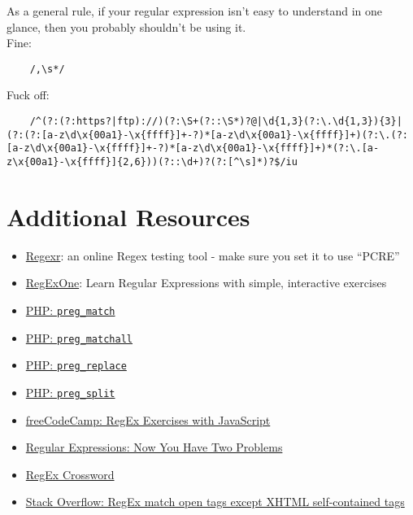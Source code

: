 As a general rule, if your regular expression isn't easy to understand in one glance, then you probably shouldn't be using it.
\\

Fine:

\begin{verbatim}
    /,\s*/
\end{verbatim}

Fuck off:

\begin{verbatim}
    /^(?:(?:https?|ftp)://)(?:\S+(?::\S*)?@|\d{1,3}(?:\.\d{1,3}){3}|(?:(?:[a-z\d\x{00a1}-\x{ffff}]+-?)*[a-z\d\x{00a1}-\x{ffff}]+)(?:\.(?:[a-z\d\x{00a1}-\x{ffff}]+-?)*[a-z\d\x{00a1}-\x{ffff}]+)*(?:\.[a-z\x{00a1}-\x{ffff}]{2,6}))(?::\d+)?(?:[^\s]*)?$/iu
\end{verbatim}



\section{Additional Resources}

\begin{itemize}[leftmargin=*]
    \item \href{https://regexr.com}{Regexr}: an online Regex testing tool - make sure you set it to use ``PCRE''
    \item \href{https://regexone.com/}{RegExOne}: Learn Regular Expressions with simple, interactive exercises
    \item \href{http://www.php.net/manual/en/function.preg-match.php}{PHP: \texttt{preg\_match}}
    \item \href{http://www.php.net/manual/en/function.preg-match-all.php}{PHP: \texttt{preg\_matchall}}
    \item \href{http://www.php.net/manual/en/function.preg-replace.php}{PHP: \texttt{preg\_replace}}
    \item \href{http://www.php.net/manual/en/function.preg-split.php}{PHP: \texttt{preg\_split}}
    \item \href{https://www.freecodecamp.org/learn/javascript-algorithms-and-data-structures/regular-expressions/using-the-test-method}{freeCodeCamp: RegEx Exercises with JavaScript}
    \item \href{https://blog.codinghorror.com/regular-expressions-now-you-have-two-problems/}{Regular Expressions: Now You Have Two Problems}
    \item \href{http://www.regexcrossword.com/}{RegEx Crossword}
    \item \href{https://stackoverflow.com/a/1732454}{Stack Overflow: RegEx match open tags except XHTML self-contained tags}
\end{itemize}
